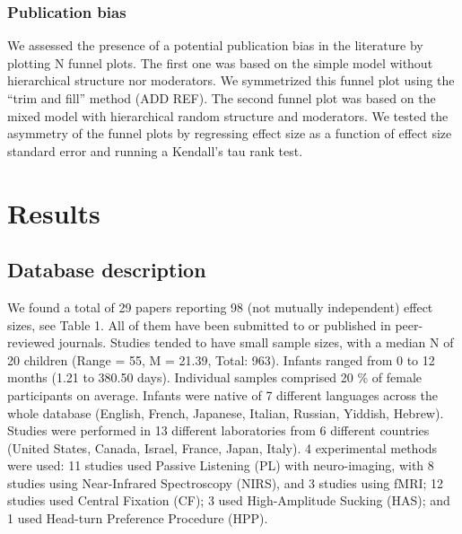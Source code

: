 \documentclass[man]{apa6}
\begin{document}
\subsubsection{Publication bias}\label{publication-bias}

We assessed the presence of a potential publication bias in the
literature by plotting N funnel plots. The first one was based on the
simple model without hierarchical structure nor moderators. We
symmetrized this funnel plot using the \enquote{trim and fill} method
(ADD REF). The second funnel plot was based on the mixed model with
hierarchical random structure and moderators. We tested the asymmetry of
the funnel plots by regressing effect size as a function of effect size
standard error and running a Kendall's tau rank test.

\section{Results}\label{results}

\subsection{Database description}\label{database-description}

We found a total of 29 papers reporting 98 (not mutually independent)
effect sizes, see Table 1. All of them have been submitted to or
published in peer-reviewed journals. Studies tended to have small sample
sizes, with a median N of 20 children (Range = 55, M = 21.39, Total:
963). Infants ranged from 0 to 12 months (1.21 to 380.50 days).
Individual samples comprised 20 \% of female participants on average.
Infants were native of 7 different languages across the whole database
(English, French, Japanese, Italian, Russian, Yiddish, Hebrew). Studies
were performed in 13 different laboratories from 6 different countries
(United States, Canada, Israel, France, Japan, Italy). 4 experimental
methods were used: 11 studies used Passive Listening (PL) with
neuro-imaging, with 8 studies using Near-Infrared Spectroscopy (NIRS),
and 3 studies using fMRI; 12 studies used Central Fixation (CF); 3 used
High-Amplitude Sucking (HAS); and 1 used Head-turn Preference Procedure
(HPP).
\end{document}
